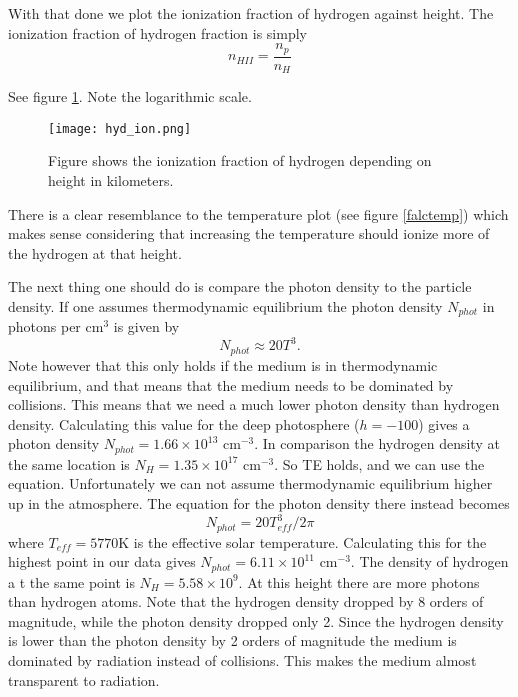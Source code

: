 \documentclass{aa}   %
\begin{document}
With that done we plot the ionization fraction of hydrogen against height. 
The ionization fraction of hydrogen fraction is simply
\begin{equation}
 n_{HII} = \frac{n_p}{n_H}
\end{equation}

See figure \ref{hyd_ion}. Note the logarithmic scale.
\begin{figure}
 \texttt{[image: hyd\_ion.png]}
 \caption{Figure shows the ionization fraction of hydrogen depending on height in kilometers.}
 \label{hyd_ion} 
\end{figure}
There is a clear resemblance to the temperature plot (see figure \ref{falctemp}) which makes sense considering that increasing the temperature should ionize more of the hydrogen at that height.

The next thing one should do is compare the photon density to the particle density.
If one assumes thermodynamic equilibrium the photon density $N_{phot}$ in photons per cm$^3$ is given by
\begin{equation}
 N_{phot} \approx 20T^3.
\end{equation}
Note however that this only holds if the medium is in thermodynamic equilibrium, and that means that the medium needs to be dominated by collisions. This means that we need a much lower photon density than hydrogen density.
Calculating this value for the deep photosphere ($h = -100$) gives a photon density $N_{phot} = 1.66\times10^{13}$ cm$^{-3}$. In comparison the hydrogen density at the same location is $N_H = 1.35\times10^{17}$ cm$^{-3}$. So TE holds, and we can use the equation.
Unfortunately we can not assume thermodynamic equilibrium higher up in the atmosphere. The equation for the photon density there instead becomes
\begin{equation}
 N_{phot} = 20T_{eff}^3/2\pi
\end{equation}
where $T_{eff} = 5770$K is the effective solar temperature.
Calculating this for the highest point in our data gives $N_{phot} = 6.11\times 10^{11}$ cm$^{-3}$. The density of hydrogen a
t the same point is $N_H = 5.58\times 10^9$. At this height there are more photons than hydrogen atoms. Note that the hydrogen density dropped by 8 orders of magnitude, while the photon density dropped only 2.
Since the hydrogen density is lower than the photon density by 2 orders of magnitude the medium is dominated by radiation instead of collisions. This makes the medium almost transparent to radiation.
\end{document}
